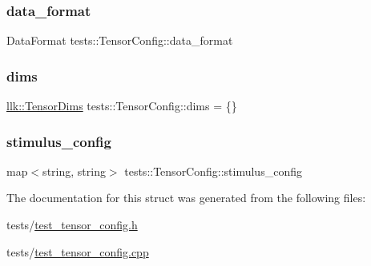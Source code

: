 \subsubsection{\texorpdfstring{data\+\_\+format}{data\_format}}
{\footnotesize\ttfamily Data\+Format tests\+::\+Tensor\+Config\+::data\+\_\+format}

\mbox{\label{structtests_1_1TensorConfig_a7b27f127ff4b7a04694dfad1d7500244}} 
\subsubsection{\texorpdfstring{dims}{dims}}
{\footnotesize\ttfamily \hyperlink{structllk_1_1TensorDims}{llk\+::\+Tensor\+Dims} tests\+::\+Tensor\+Config\+::dims = \{\}}

\mbox{\label{structtests_1_1TensorConfig_a05d85214444feab610a4e4752f51d176}} 
\subsubsection{\texorpdfstring{stimulus\+\_\+config}{stimulus\_config}}
{\footnotesize\ttfamily map$<$string, string$>$ tests\+::\+Tensor\+Config\+::stimulus\+\_\+config}



The documentation for this struct was generated from the following files\+:\begin{DoxyCompactItemize}
\item 
tests/\hyperlink{test__tensor__config_8h}{test\+\_\+tensor\+\_\+config.\+h}\item 
tests/\hyperlink{test__tensor__config_8cpp}{test\+\_\+tensor\+\_\+config.\+cpp}\end{DoxyCompactItemize}

